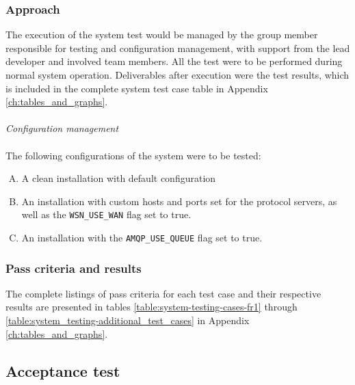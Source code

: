 \subsubsection{Approach}

The execution of the system test would be managed by the group member responsible for testing and configuration management, with support from the lead developer and involved team members. All the test were to be performed during normal system operation. Deliverables after execution were the test results, which is included in the complete system test case table in Appendix \ref{ch:tables_and_graphs}. \\
\\
\textit{Configuration management}
\\
\\
The following configurations of the system were to be tested:
\begin{enumerate}[A.]
\item A clean installation with default configuration
\item An installation with custom hosts and ports set for the protocol servers, as well as the \verb!WSN_USE_WAN! flag set to true.
\item An installation with the \verb!AMQP_USE_QUEUE! flag set to true.
\end{enumerate}

\subsubsection{Pass criteria and results}

The complete listings of pass criteria for each test case and their respective results are presented in tables \ref{table:system-testing-cases-fr1} through \ref{table:system_testing-additional_test_cases} in Appendix \ref{ch:tables_and_graphs}.

\subsection{Acceptance test}
\label{subsec:testing-test_execution-acceptance_test}

